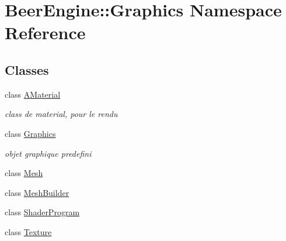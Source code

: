 \hypertarget{namespace_beer_engine_1_1_graphics}{}\section{Beer\+Engine\+:\+:Graphics Namespace Reference}
\label{namespace_beer_engine_1_1_graphics}
\subsection*{Classes}
\begin{DoxyCompactItemize}
\item 
class \mbox{\hyperlink{class_beer_engine_1_1_graphics_1_1_a_material}{A\+Material}}
\begin{DoxyCompactList}\small\item\em class de material, pour le rendu \end{DoxyCompactList}\item 
class \mbox{\hyperlink{class_beer_engine_1_1_graphics_1_1_graphics}{Graphics}}
\begin{DoxyCompactList}\small\item\em objet graphique predefini \end{DoxyCompactList}\item 
class \mbox{\hyperlink{class_beer_engine_1_1_graphics_1_1_mesh}{Mesh}}
\item 
class \mbox{\hyperlink{class_beer_engine_1_1_graphics_1_1_mesh_builder}{Mesh\+Builder}}
\item 
class \mbox{\hyperlink{class_beer_engine_1_1_graphics_1_1_shader_program}{Shader\+Program}}
\item 
class \mbox{\hyperlink{class_beer_engine_1_1_graphics_1_1_texture}{Texture}}
\end{DoxyCompactItemize}
